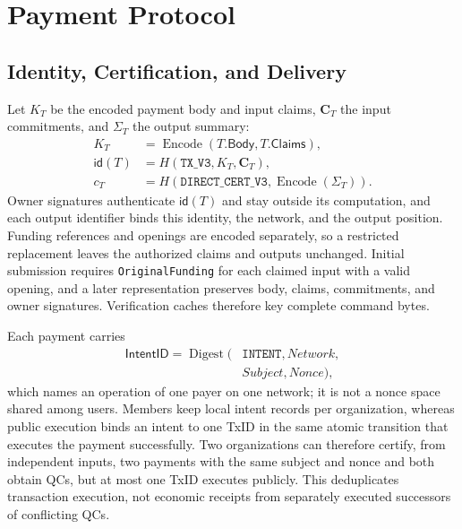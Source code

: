 \section{Payment Protocol}
\label{sec:protocol}

\subsection{Identity, Certification, and Delivery}
\label{sec:protocol-certification}

Let $K_T$ be the encoded payment body and input claims, $\mathbf{C}_T$ the input commitments, and $\Sigma_T$ the output summary:
\begin{equation}
  \begin{aligned}
    K_T &= \operatorname{Encode}(T.\mathsf{Body},T.\mathsf{Claims}),\\
    \mathsf{id}(T) &= H(\texttt{TX\_V3},K_T,\mathbf{C}_T),\\
    c_T &= H(\texttt{DIRECT\_CERT\_V3},\operatorname{Encode}(\Sigma_T)).
  \end{aligned}
  \label{eq:protocol-identities}
\end{equation}
Owner signatures authenticate $\mathsf{id}(T)$ and stay outside its computation, and each output identifier binds this identity, the network, and the output position. Funding references and openings are encoded separately, so a restricted replacement leaves the authorized claims and outputs unchanged. Initial submission requires \texttt{OriginalFunding} for each claimed input with a valid opening, and a later representation preserves body, claims, commitments, and owner signatures. Verification caches therefore key complete command bytes.

Each payment carries
\[\begin{aligned}
\mathsf{IntentID}=\operatorname{Digest}(&\texttt{INTENT},\mathit{Network},\\
&\mathit{Subject},\mathit{Nonce}),
\end{aligned}\]
which names an operation of one payer on one network; it is not a nonce space shared among users. Members keep local intent records per organization, whereas public execution binds an intent to one TxID in the same atomic transition that executes the payment successfully. Two organizations can therefore certify, from independent inputs, two payments with the same subject and nonce and both obtain QCs, but at most one TxID executes publicly. This deduplicates transaction execution, not economic receipts from separately executed successors of conflicting QCs.

